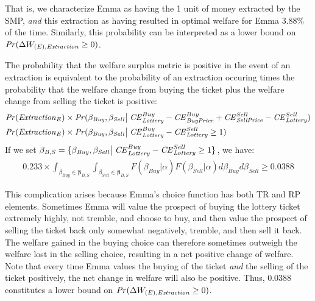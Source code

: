 \documentclass[../main.tex]{subfiles}
\begin{document}
That is, we characterize Emma as having the 1 unit of money extracted by the SMP, \textit{and} this extraction as having resulted in optimal welfare for Emma $3.88\%$ of the time.
Similarly, this probability can be interpreted as a lower bound on ${\mathit{Pr}}(\Delta W_{(E),\mathit{Extraction}} \geq 0)$.

The probability that the welfare surplus metric is positive in the event of an extraction is equivalent to the probability of an extraction occuring times the probability that the welfare change from buying the ticket plus the welfare change from selling the ticket is positive:
\begin{align*}
{\ensuremath{\mathit{Pr}}}(\mathit{Extraction}_E) &\times {\ensuremath{\mathit{Pr}}}(\beta_{\mathit{Buy}},\beta_{\mathit{Sell}} \big| \; {\mathit{CE}}_{\mathit{Lottery}}^{Buy} - {\mathit{CE}}_{\mathit{Buy Price}}^{Buy} + {\mathit{CE}}_{\mathit{Sell Price}}^{Sell} - {\mathit{CE}}_{\mathit{Lottery}}^{Sell} )\\
{\mathit{Pr}}(\mathit{Extraction}_E) &\times {\ensuremath{\mathit{Pr}}}(\beta_{\mathit{Buy}},\beta_{\mathit{Sell}} \big| \; {\mathit{CE}}_{\mathit{Lottery}}^{Buy} - {\mathit{CE}}_{\mathit{Lottery}}^{Sell} \geq 1 )
\end{align*}
If we set $\mathbf{\beta_{\mathit{B,S}}} = \{ \beta_{\mathit{Buy}},\beta_{\mathit{Sell}} \big| \; {\mathit{CE}}_{\mathit{Lottery}}^{Buy} - {\mathit{CE}}_{\mathit{Lottery}}^{Sell} \geq 1\}$,{\footnotemark} we have:
\begin{align}
	0.233 \times \int_{\beta_{\mathit{Buy}} \in \mathbf{\beta_{\mathit{B,S}}}} \int_{\beta_{\mathit{Sell}} \in \mathbf{\beta_{\mathit{B,S}}}} F(\beta_{\mathit{Buy}} | \alpha) F(\beta_{\mathit{Sell}}|\alpha) d\beta_{\mathit{Buy}} d\beta_{\mathit{Sell}} \geq 0.0388
\end{align}

This complication arises because Emma's choice function has both TR and RP elements.
Sometimes Emma will value the prospect of buying the lottery ticket extremely highly, not tremble, and choose to buy, and then value the prospect of selling the ticket back only somewhat negatively, tremble, and then sell it back.
The welfare gained in the buying choice can therefore sometimes outweigh the welfare lost in the selling choice, resulting in a net positive change of welfare.
Note that every time Emma values the buying of the ticket \textit{and} the selling of the ticket positively, the net change in welfare will also be positive.
Thus, $0.0388$ constitutes a lower bound on ${\mathit{Pr}}(\Delta W_{(E),\mathit{Extraction}} \geq 0)$.

\addtocounter{footnote}{-1}
\end{document}
